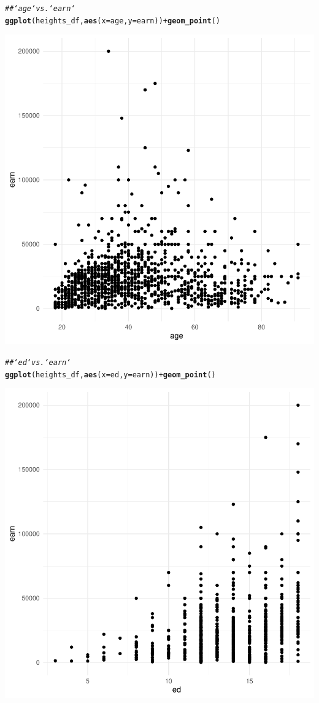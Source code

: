 \documentclass{article}\usepackage[]{graphicx}\usepackage[]{xcolor}
\makeatletter
\newcommand{\hlcom}[1]{\textcolor[rgb]{0.678,0.584,0.686}{\textit{#1}}}%
\newcommand{\hlopt}[1]{\textcolor[rgb]{0,0,0}{#1}}%
\newcommand{\hlstd}[1]{\textcolor[rgb]{0.345,0.345,0.345}{#1}}%
\newcommand{\hlkwc}[1]{\textcolor[rgb]{0.333,0.667,0.333}{#1}}%
\newcommand{\hlkwd}[1]{\textcolor[rgb]{0.737,0.353,0.396}{\textbf{#1}}}%
\newenvironment{kframe}{%
 \def\at@end@of@kframe{}%
 \ifinner\ifhmode%
  \def\at@end@of@kframe{\end{minipage}}%
  \begin{minipage}{\columnwidth}%
 \fi\fi%
 \def\FrameCommand##1{\hskip\@totalleftmargin \hskip-\fboxsep
 \colorbox{shadecolor}{##1}\hskip-\fboxsep
     \hskip-\linewidth \hskip-\@totalleftmargin \hskip\columnwidth}%
 \MakeFramed {\advance\hsize-\width
   \@totalleftmargin\z@ \linewidth\hsize
   \@setminipage}}%
 {\par\unskip\endMakeFramed%
 \at@end@of@kframe}
\newenvironment{knitrout}{}{} %
\makeatother
\begin{document}
\begin{knitrout}
{}


\begin{kframe}\begin{alltt}
\hlcom{## `age` vs. `earn`}
\hlkwd{ggplot}\hlstd{(heights_df,} \hlkwd{aes}\hlstd{(}\hlkwc{x} \hlstd{= age,} \hlkwc{y} \hlstd{= earn))} \hlopt{+} \hlkwd{geom_point}\hlstd{()}
\end{alltt}
\end{kframe}

{\centering \includegraphics[width=.6\linewidth]{figure/assignment-03-Quintero-Vasquez-Johnatan-Rnwauto-report-2} 

}


\begin{kframe}\begin{alltt}
\hlcom{## `ed` vs. `earn`}
\hlkwd{ggplot}\hlstd{(heights_df,} \hlkwd{aes}\hlstd{(}\hlkwc{x} \hlstd{= ed,} \hlkwc{y} \hlstd{= earn))} \hlopt{+} \hlkwd{geom_point}\hlstd{()}
\end{alltt}
\end{kframe}

{\centering \includegraphics[width=.6\linewidth]{figure/assignment-03-Quintero-Vasquez-Johnatan-Rnwauto-report-3} 

}
\end{knitrout}
\end{document}
